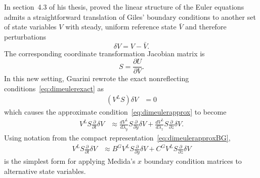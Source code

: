 \documentclass[letterpaper,11pt,nointlimits,reqno,draft]{amsart}
\begin{document}
In section~4.3 of his thesis, \citet{Guarini1998} proved the linear
structure of the Euler equations admits a straightforward translation of Giles'
boundary conditions to another set of state variables $V$ with steady, uniform
reference state $\bar{V}$ and therefore perturbations
\[
  \delta{}V = V - \bar{V}.
\]
The corresponding coordinate transformation Jacobian matrix is
\[
   S = \frac{\partial{}U}{\partial{}V}
   .
\]
In this new setting, Guarini rewrote the exact nonreflecting
conditions~\eqref{eq:dimeulerexact} as
\begin{align}
  \left(V^L S\right) \delta{}V &= 0
\end{align}
which causes the approximate condition~\eqref{eq:dimeulerapprox} to become
\begin{align}
\label{eq:dimeulertransform}
  V^L
  S
  \frac{\partial}{\partial{}t}
  \delta{}V
  &\approx
  \frac{dV^L}{d\lambda_y}
  S
  \frac{\partial}{\partial{}y}
  \delta{}V
  +
  \frac{dV^L}{d\lambda_z}
  S
  \frac{\partial}{\partial{}z}
  \delta{}V
  .
\end{align}
Using notation from the compact representation~\eqref{eq:dimeulerapproxBG},
\begin{align}
\label{eq:dimeulertransformcharnot}
  V^L S
  \frac{\partial}{\partial{}t}
  \delta{}V
  &\approx
  B^G V^L S
  \frac{\partial}{\partial{}y}
  \delta{}V
  +
  C^G V^L S
  \frac{\partial}{\partial{}z}
  \delta{}V
\end{align}
is the simplest form for applying Medida's $x$ boundary condition matrices to
alternative state variables.
\end{document}
